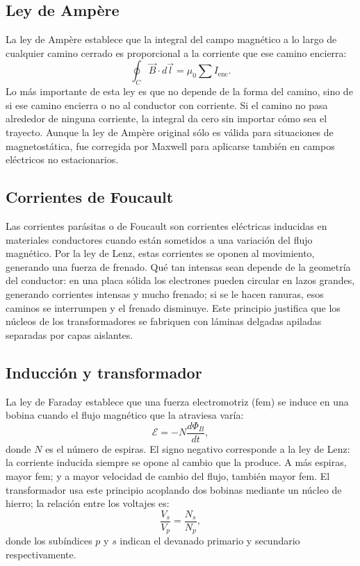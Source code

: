\documentclass[11pt,twocolumn]{article}
\begin{document}
\subsection*{Ley de Amp\`ere}

La ley de Amp\`ere establece que la integral del campo magn\'etico a lo largo de cualquier camino cerrado es proporcional a la corriente que ese camino encierra:
\begin{equation}
  \oint_C \vec{B} \cdot d\vec{l} = \mu_0 \sum I_{\text{enc}}.
\end{equation}
Lo m\'as importante de esta ley es que no depende de la forma del camino, sino de si ese camino encierra o no al conductor con corriente. Si el camino no pasa alrededor de ninguna corriente, la integral da cero sin importar c\'omo sea el trayecto. Aunque la ley de Amp\`ere original s\'olo es v\'alida para situaciones de magnetost\'atica, fue corregida por Maxwell para aplicarse tambi\'en en campos el\'ectricos no estacionarios.

\subsection*{Corrientes de Foucault}

Las corrientes par\'asitas o de Foucault son corrientes el\'ectricas inducidas en materiales conductores cuando est\'an sometidos a una variaci\'on del flujo magn\'etico. Por la ley de Lenz, estas corrientes se oponen al movimiento, generando una fuerza de frenado. Qu\'e tan intensas sean depende de la geometr\'ia del conductor: en una placa s\'olida los electrones pueden circular en lazos grandes, generando corrientes intensas y mucho frenado; si se le hacen ranuras, esos caminos se interrumpen y el frenado disminuye. Este principio justifica que los n\'ucleos de los transformadores se fabriquen con l\'aminas delgadas apiladas separadas por capas aislantes.

\subsection*{Inducci\'on y transformador}

La ley de Faraday establece que una fuerza electromotriz (fem) se induce en una bobina cuando el flujo magn\'etico que la atraviesa var\'ia:
\begin{equation}
  \mathcal{E} = -N\frac{d\Phi_B}{dt},
\end{equation}
donde $N$ es el n\'umero de espiras. El signo negativo corresponde a la ley de Lenz: la corriente inducida siempre se opone al cambio que la produce. A m\'as espiras, mayor fem; y a mayor velocidad de cambio del flujo, tambi\'en mayor fem. El transformador usa este principio acoplando dos bobinas mediante un n\'ucleo de hierro; la relaci\'on entre los voltajes es:
\begin{equation}
  \frac{V_s}{V_p} = \frac{N_s}{N_p},
\end{equation}
donde los sub\'indices $p$ y $s$ indican el devanado primario y secundario respectivamente.
\end{document}
